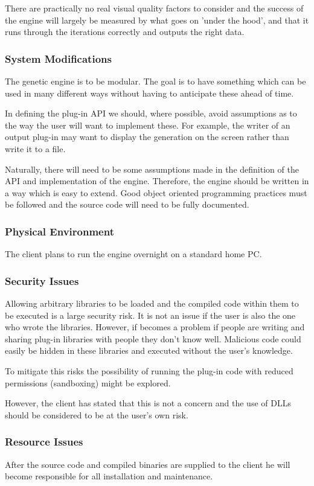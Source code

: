 \begin{enumerate}
There are practically no real visual quality factors to consider and the success of the engine will largely be measured by what goes on 'under the hood', and that it runs through the iterations correctly and outputs the right data.

\subsubsection{System Modifications}
The genetic engine is to be modular. The goal is to have something which can be used in many different ways without having to anticipate these ahead of time.

In defining the plug-in API we should, where possible, avoid assumptions as to the way the user will want to implement these. For example, the writer of an output plug-in may want to display the generation on the screen rather than write it to a file. 

Naturally, there will need to be some assumptions made in the definition of the API and implementation of the engine. Therefore, the engine should be written in a way which is easy to extend. Good object oriented programming practices must be followed and the source code will need to be fully documented.

\subsubsection{Physical Environment}
The client plans to run the engine overnight on a standard home PC.

\subsubsection{Security Issues}
Allowing arbitrary libraries to be loaded and the compiled code within them to be executed is a large security risk. It is not an issue if the user is also the one who wrote the libraries. However, if becomes a problem if people are writing and sharing plug-in libraries with people they don't know well. Malicious code could easily be hidden in these libraries and executed without the user's knowledge.

To mitigate this risks the possibility of running the plug-in code with reduced permissions (sandboxing) might be explored. 

However, the client has stated that this is not a concern and the use of DLLs should be considered to be at the user's own risk.

\subsubsection{Resource Issues}
After the source code and compiled binaries are supplied to the client he will become responsible for all installation and maintenance.


\end{enumerate}
